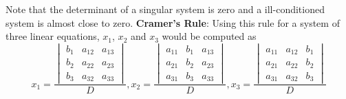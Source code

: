\documentclass[book.tex]{subfiles}
\begin{document}
\begin{example}
Note that the determinant of a singular system is zero and a ill-conditioned system is almost close to zero.
\textbf{Cramer's Rule}: Using this rule for a system of three linear equations, $x_1$, $x_2$ and $x_3$ would be computed as
\[
x_1 =\dfrac{
\begin{vmatrix}
b_1 & a_{12} & a_{13} \\ 
b_2 & a_{22} & a_{23} \\ 
b_3 & a_{32} & a_{33}
\end{vmatrix}
}{D},
x_2 =\dfrac{
\begin{vmatrix}
a_{11} & b_1 & a_{13} \\ 
a_{21} & b_2 & a_{23} \\ 
a_{31} & b_3 & a_{33}
\end{vmatrix}
}{D},
x_3 =\dfrac{
\begin{vmatrix}
a_{11} & a_{12} & b_1 \\ 
a_{21} & a_{22} & b_2 \\ 
a_{31} & a_{32} & b_3
\end{vmatrix}
}{D}
\]
\end{example}
\end{document}
